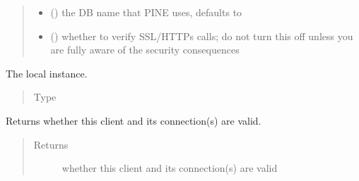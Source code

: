 \documentclass[letterpaper,10pt,english]{sphinxmanual}
\begin{document}
\begin{fulllineitems}
\begin{quote}
\begin{description}
\begin{itemize}
\item {} 
\sphinxAtStartPar
{} (\sphinxstyleliteralemphasis{\sphinxupquote{, }}) \textendash{} the DB name that PINE uses, defaults to 

\item {} 
\sphinxAtStartPar
{} (\sphinxstyleliteralemphasis{\sphinxupquote{, }}) \textendash{} whether to verify SSL/HTTPs calls; do not turn this off unless you
are fully aware of the security consequences

\end{itemize}

\end{description}\end{quote}

\begin{fulllineitems}
\label{\detokenize{autoapi/pine/client/index:pine.client.LocalPineClient.eve}}
\sphinxAtStartPar
The local  instance.
\begin{quote}\begin{description}
\item[{Type}] \leavevmode
\sphinxAtStartPar
{\hyperref[\detokenize{autoapi/pine/client/client/index:pine.client.client.EveClient}]{}}

\end{description}\end{quote}

\end{fulllineitems}


\begin{fulllineitems}
\label{\detokenize{autoapi/pine/client/index:pine.client.LocalPineClient.is_valid}}
\sphinxAtStartPar
Returns whether this client and its connection(s) are valid.
\begin{quote}\begin{description}
\item[{Returns}] \leavevmode
\sphinxAtStartPar
whether this client and its connection(s) are valid


\end{description}
\end{quote}
\end{fulllineitems}
\end{fulllineitems}
\end{document}
